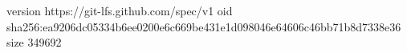 version https://git-lfs.github.com/spec/v1
oid sha256:ea9206dc05334b6ee0200e6c669be431e1d098046e64606c46bb71b8d7338e36
size 349692
